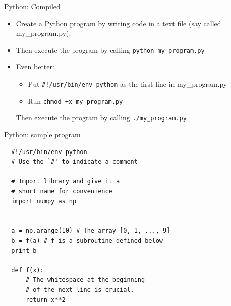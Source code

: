\documentclass{beamer}
\begin{document}
\begin{frame}{Python: Compiled}
  \begin{itemize}

  \item {Create a Python program by writing code in a text file (say called my\_program.py).}
  \item {Then execute the program by calling \alert{\texttt{python~my\_program.py}}}
  
  \item {Even better:
  \begin{itemize}
   \item Put \alert{\texttt{\#!/usr/bin/env~python}} as the first line in my\_program.py
   \item Run \alert{\texttt{chmod +x~my\_program.py}}
  \end{itemize}
  Then execute the program by calling \alert{\texttt{./my\_program.py}}}
  \end{itemize}
\end{frame}

\begin{frame}[fragile]{Python: sample program}
  \begin{lstlisting}
  #!/usr/bin/env python
  # Use the `#' to indicate a comment
  
  # Import library and give it a 
  # short name for convenience
  import numpy as np
  
  
  a = np.arange(10) # The array [0, 1, ..., 9]
  b = f(a) # f is a subroutine defined below
  print b
  
  def f(x): 
      # The whitespace at the beginning
      # of the next line is crucial.
      return x**2 
  
  \end{lstlisting}

\end{frame}
\end{document}

